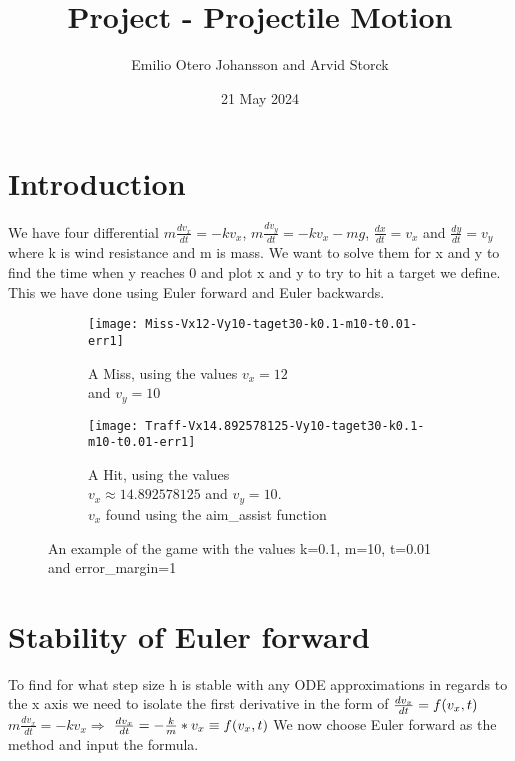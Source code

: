 \documentclass{article}
\title{Project - Projectile Motion}
\author{Emilio Otero Johansson and Arvid Storck}
\date{21 May 2024}
\begin{document}
\maketitle
\thispagestyle{empty}
\newpage
\setcounter{page}{1}
\section{Introduction}
We have four differential $m\frac{dv_x}{dt}=-kv_x$, $m\frac{dv_y}{dt}=-kv_x-mg$, $\frac{dx}{dt}=v_x$ and $\frac{dy}{dt}=v_y$ where k is wind resistance and m is mass. We want to solve them for x and y to find the time when y reaches 0 and plot x and y to try to hit a target we define. This we have done using Euler forward and Euler backwards.

\begin{figure}[h]

\begin{subfigure}{0.49\textwidth}
\texttt{[image: Miss-Vx12-Vy10-taget30-k0.1-m10-t0.01-err1]} 
\caption{A Miss, using the values $v_x=12$\\ and $v_y=10$\\ }
\label{fig:subim1}
\end{subfigure}
\begin{subfigure}{0.49\textwidth}
\texttt{[image: Traff-Vx14.892578125-Vy10-taget30-k0.1-m10-t0.01-err1]}
\caption{A Hit, using the values\\ $v_x\approx14.892578125$ and $v_y=10$.\\$v_x$ found using the aim\_assist function}
\label{fig:subim2}
\end{subfigure}

\caption{An example of the game with the values k=0.1, m=10, t=0.01\\ and error\_margin=1}
\label{fig:image2}
\end{figure}
\section{Stability of Euler forward}

To find for what step size h is stable with any ODE approximations in regards to the x axis we need to isolate the first derivative in the form of $\frac{dv_x}{dt}=f(v_x,t)\newline\newline$
$m\frac{dv_x}{dt}=-kv_x\Rightarrow$
$\frac{dv_x}{dt}=-\frac{k}{m}*v_x\equiv f(v_x,t)\newline\newline$
We now choose Euler forward as the method and input the formula.
\end{document}
